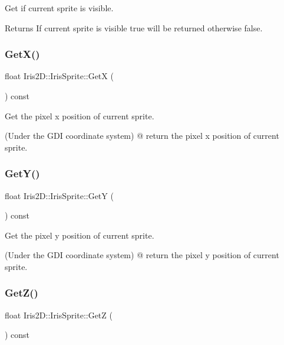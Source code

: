 Get if current sprite is visible. 

\begin{DoxyReturn}{Returns}
If current sprite is visible true will be returned otherwise false. 
\end{DoxyReturn}
\mbox{\label{class_iris2_d_1_1_iris_sprite_a6de92be964427290ad6daa0ee294cf21}} 
\subsubsection{\texorpdfstring{Get\+X()}{GetX()}}
{\footnotesize\ttfamily float Iris2\+D\+::\+Iris\+Sprite\+::\+GetX (\begin{DoxyParamCaption}{ }\end{DoxyParamCaption}) const}



Get the pixel x position of current sprite. 

(Under the G\+DI coordinate system) @ return the pixel x position of current sprite. \mbox{\label{class_iris2_d_1_1_iris_sprite_afe8423cb0d34987c87f020ba3ba34b67}} 
\subsubsection{\texorpdfstring{Get\+Y()}{GetY()}}
{\footnotesize\ttfamily float Iris2\+D\+::\+Iris\+Sprite\+::\+GetY (\begin{DoxyParamCaption}{ }\end{DoxyParamCaption}) const}



Get the pixel y position of current sprite. 

(Under the G\+DI coordinate system) @ return the pixel y position of current sprite. \mbox{\label{class_iris2_d_1_1_iris_sprite_ad4966003c9bf2ad093db013de626e44c}} 
\subsubsection{\texorpdfstring{Get\+Z()}{GetZ()}}
{\footnotesize\ttfamily float Iris2\+D\+::\+Iris\+Sprite\+::\+GetZ (\begin{DoxyParamCaption}{ }\end{DoxyParamCaption}) const}



